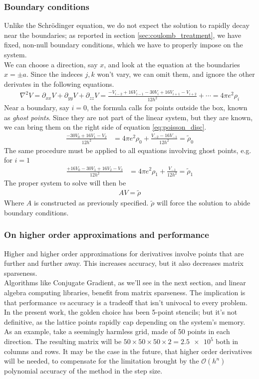 \subsubsection{Boundary conditions}
Unlike the Schr\"odinger equation, we do not expect the solution to rapidly decay near the boundaries; as reported in section \ref{sec:coulomb_treatment}, we have fixed, non-null boundary conditions, which we have to properly impose on the system.
\\We can choose a direction, say $x$, and look at the equation at the boundaries $x=\pm a$. Since the indeces $j,k$ won't vary, we can omit them, and ignore the other derivates in the following equations.
\begin{align}
    \label{eq:poisson_disc}
    \nabla^2 V = \partial_{xx} V + \partial_{yy}V + \partial_{zz}V = \frac{-V_{i-2} + 16V_{i-1} -30V_i + 16V_{i+1} - V_{i+2}}{12h^2}+\cdots=4\pi e^2 \rho_i
\end{align}
Near a boundary, say $i = 0$, the formula calls for points outside the box, known as \textit{ghost points}. Since they are not part of the linear system, but they are known, we can bring them on the right side of equation \ref{eq:poisson_disc}.
\begin{align}
    \frac{-30 V_0 + 16 V_1 - V_2 }{12h^2} &= 4\pi e^2 \rho_0 +\frac{ V_{-2} -16V_{-1}}{12h^2} = \tilde\rho_0
\end{align}
The same procedure must be applied to all equations involving ghost points, e.g. for $i=1$
\begin{align}
    \frac{+16V_0 -30V_{1} + 16 V_2 - V_3}{12h^2} &= 4\pi e^2 \rho_1 + \frac{V_{-1} }{12h^2} = \tilde\rho_1
\end{align}
The proper system to solve will then be
\begin{align}
A V = \tilde \rho
\end{align}
Where $A$ is constructed as previously specified. $\tilde \rho $ will force the solution to abide boundary conditions.
\subsubsection{On higher order approximations and performance}
Higher and higher order approximations for derivatives involve points that are further and further away. This increases accuracy, but it also decreases matrix sparseness.
\\Algorithms like Conjugate Gradient, as we'll see in the next section,  and linear algebra computing libraries, benefit from matrix sparseness. The implication is that performance \textit{vs} accuracy is a tradeoff that isn't univocal to every problem.
\\In the present work, the golden choice has been 5-point stencils; but it's not definitive, as the lattice points rapidly cap depending on the system's memory.
\\As an example, take a seemingly harmless grid, made of 50 points in each direction. The resulting matrix will be $50\times 50 \times 50 \times 2=\num{2.5e5}$ both in columns and rows. 
It may be the case in the future, that higher order derivatives will be needed, to compensate for the limitation brought by the $\mathcal O (h^n)$ polynomial accuracy of the method in the step size.